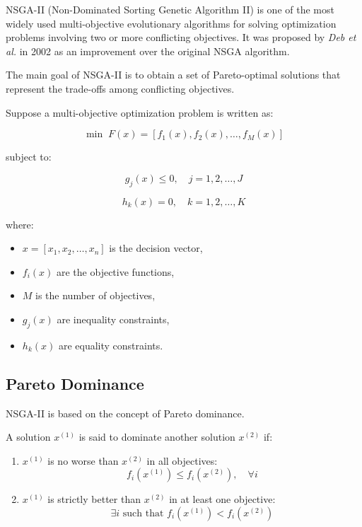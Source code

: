 \documentclass[11pt]{article}
\begin{document}
NSGA-II (Non-Dominated Sorting Genetic Algorithm II) is one of the most widely used multi-objective evolutionary algorithms for solving optimization problems involving two or more conflicting objectives. It was proposed by \textit{Deb et al.} in 2002 as an improvement over the original NSGA algorithm.

The main goal of NSGA-II is to obtain a set of Pareto-optimal solutions that represent the trade-offs among conflicting objectives.

Suppose a multi-objective optimization problem is written as:

\begin{equation}
\min \; F(x) = \left[f_1(x), f_2(x), \dots, f_M(x)\right]
\end{equation}

subject to:

\begin{equation}
g_j(x) \leq 0, \quad j = 1,2,\dots,J
\end{equation}

\begin{equation}
h_k(x) = 0, \quad k = 1,2,\dots,K
\end{equation}

where:
\begin{itemize}
    \item $x = [x_1, x_2, \dots, x_n]$ is the decision vector,
    \item $f_i(x)$ are the objective functions,
    \item $M$ is the number of objectives,
    \item $g_j(x)$ are inequality constraints,
    \item $h_k(x)$ are equality constraints.
\end{itemize}

\subsection{Pareto Dominance}

NSGA-II is based on the concept of Pareto dominance.

A solution $x^{(1)}$ is said to dominate another solution $x^{(2)}$ if:

\begin{enumerate}
    \item $x^{(1)}$ is no worse than $x^{(2)}$ in all objectives:
    \begin{equation}
    f_i(x^{(1)}) \leq f_i(x^{(2)}), \quad \forall i
    \end{equation}

    \item $x^{(1)}$ is strictly better than $x^{(2)}$ in at least one objective:
    \begin{equation}
    \exists i \text{ such that } f_i(x^{(1)}) < f_i(x^{(2)})
    \end{equation}
\end{enumerate}
\end{document}
